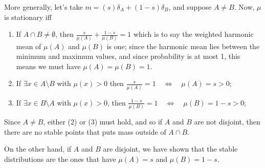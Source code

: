 \documentclass{article}
\begin{document}
\begin{computation}
    More generally, let's take $m = (s)\delta_A + (1-s)\delta_B$, and suppose $A \ne B$.
    Now, $\mu$ is stationary iff
    \begin{enumerate}
        \item If $A \cap B \ne \emptyset$, then
        $\displaystyle 
            \frac{s}{\mu(A)} +  \frac{1-s}{\mu(B)} = 1
        $
        which is to say the weighted harmonic mean of $\mu(A)$ and $\mu(B)$ is one; since the harmonic mean lies between the minimum and maximum values, and since probability is at most 1, this means we must have $\mu(A) = \mu(B) = 1$.
        
        \item If $\exists x \in A \setminus B$ with $\mu(x) > 0$ then 
        $\displaystyle
            \frac{s}{\mu(A)} = 1 \quad \iff\quad \mu(A) = s > 0;
        $

        \item If $\exists x \in B \setminus A$ with $\mu(x) >0$, then 
        $\displaystyle
            \frac{1-s}{\mu(B)} = 1 \quad \iff\quad \mu(B) = 1-s >0;
        $
    \end{enumerate}
    Since $A \ne B$, either (2) or (3) must hold, and so if $A$ and $B$ are not disjoint, then there are no stable points that puts mass outside of $A \cap B$. 
        
    On the other hand, if $A$ and $B$ are disjoint, we have shown that the stable distributions are the ones that have $\mu(A) = s$  and $\mu(B) = 1-s$.  
    

\end{computation}
\end{document}
